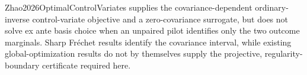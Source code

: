 Zhao2026OptimalControlVariates supplies the covariance-dependent ordinary-inverse control-variate objective and a zero-covariance surrogate, but does not solve ex ante basis choice when an unpaired pilot identifies only the two outcome marginals.  Sharp Fr\'echet results identify the covariance interval, while existing global-optimization results do not by themselves supply the projective, regularity-boundary certificate required here.